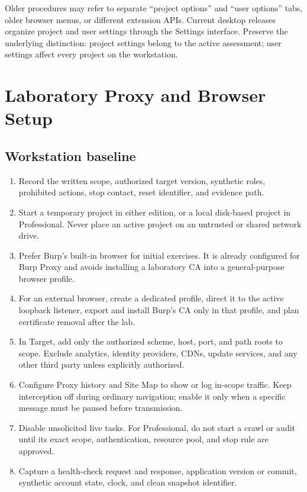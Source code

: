 \documentclass[11pt]{article}
\begin{document}
\begin{legacybox}
Older procedures may refer to separate ``project options'' and ``user options''
tabs, older browser menus, or different extension APIs. Current desktop releases
organize project and user settings through the Settings interface. Preserve the
underlying distinction: project settings belong to the active assessment;
user settings affect every project on the workstation.
\end{legacybox}

\section{Laboratory Proxy and Browser Setup}

\subsection{Workstation baseline}

\begin{procedurebox}[title=Initial laboratory setup]
\begin{enumerate}
  \item Record the written scope, authorized target version, synthetic roles,
    prohibited actions, stop contact, reset identifier, and evidence path.
  \item Start a temporary project in either edition, or a local disk-based
    project in Professional. Never place an active project on an untrusted or
    shared network drive.
  \item Prefer Burp's built-in browser for initial exercises. It is already
    configured for Burp Proxy and avoids installing a laboratory CA into a
    general-purpose browser profile.
  \item For an external browser, create a dedicated profile, direct it to the
    active loopback listener, export and install Burp's CA only in that profile,
    and plan certificate removal after the lab.
  \item In Target, add only the authorized scheme, host, port, and path roots to
    scope. Exclude analytics, identity providers, CDNs, update services, and any
    other third party unless explicitly authorized.
  \item Configure Proxy history and Site Map to show or log in-scope traffic.
    Keep interception off during ordinary navigation; enable it only when a
    specific message must be paused before transmission.
  \item Disable unsolicited live tasks. For Professional, do not start a crawl
    or audit until its exact scope, authentication, resource pool, and stop rule
    are approved.
  \item Capture a health-check request and response, application version or
    commit, synthetic account state, clock, and clean snapshot identifier.
\end{enumerate}
\end{procedurebox}
\end{document}
